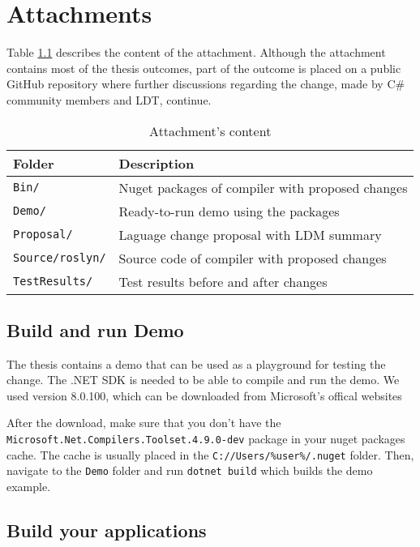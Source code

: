 \chapter{Attachments}

Table \ref{img80:attachment} describes the content of the attachment. 
Although the attachment contains most of the thesis outcomes, part of the outcome is placed on a public GitHub repository where further discussions regarding the change, made by C\# community members and \ac{LDT}, continue.
\begin{table}[h]
\centering
\begin{tabular}{ | m{11em} | m{22em}| } 
\hline
Folder & Description \\
\hline
\texttt{Bin/} & Nuget packages of compiler with proposed changes \\
\texttt{Demo/} & Ready-to-run demo using the packages \\
\texttt{Proposal/} & Laguage change proposal with LDM summary \\
\texttt{Source/roslyn/} & Source code of compiler with proposed changes \\
\texttt{TestResults/} & Test results before and after changes \\
\hline
\end{tabular}
\caption{Attachment's content }
\label{img80:attachment}
\end{table}

\section{Build and run Demo}

The thesis contains a demo that can be used as a playground for testing the change. 
The .NET SDK is needed to be able to compile and run the demo. We used version 8.0.100, which can be downloaded from Microsoft's offical websites
\par
After the download, make sure that you don't have the\\ \texttt{Microsoft.Net.Compilers.Toolset.4.9.0-dev} package in your nuget packages cache.
The cache is usually placed in the \texttt{C://Users/\%user\%/.nuget} folder.
Then, navigate to the \texttt{Demo} folder and run \texttt{dotnet build} which builds the demo example.

\section{Build your applications}

